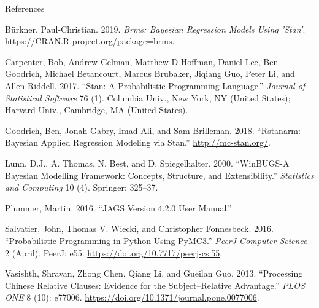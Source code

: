 \documentclass[12pt,ignorenonframetext,aspectratio=169]{beamer}
\begin{document}
\begin{frame}{References}
\protect\hypertarget{references}{}

\hypertarget{refs}{}
\leavevmode\hypertarget{ref-R-brms}{}%
Bürkner, Paul-Christian. 2019. \emph{Brms: Bayesian Regression Models Using 'Stan'}. \url{https://CRAN.R-project.org/package=brms}.

\leavevmode\hypertarget{ref-carpenter2017stan}{}%
Carpenter, Bob, Andrew Gelman, Matthew D Hoffman, Daniel Lee, Ben Goodrich, Michael Betancourt, Marcus Brubaker, Jiqiang Guo, Peter Li, and Allen Riddell. 2017. ``Stan: A Probabilistic Programming Language.'' \emph{Journal of Statistical Software} 76 (1). Columbia Univ., New York, NY (United States); Harvard Univ., Cambridge, MA (United States).

\leavevmode\hypertarget{ref-rstanarm}{}%
Goodrich, Ben, Jonah Gabry, Imad Ali, and Sam Brilleman. 2018. ``Rstanarm: Bayesian Applied Regression Modeling via Stan.'' \url{http://mc-stan.org/}.

\leavevmode\hypertarget{ref-lunn2000winbugs}{}%
Lunn, D.J., A. Thomas, N. Best, and D. Spiegelhalter. 2000. ``WinBUGS-A Bayesian Modelling Framework: Concepts, Structure, and Extensibility.'' \emph{Statistics and Computing} 10 (4). Springer: 325--37.

\leavevmode\hypertarget{ref-plummer2016jags}{}%
Plummer, Martin. 2016. ``JAGS Version 4.2.0 User Manual.''

\leavevmode\hypertarget{ref-Salvatier2016}{}%
Salvatier, John, Thomas V. Wiecki, and Christopher Fonnesbeck. 2016. ``Probabilistic Programming in Python Using PyMC3.'' \emph{PeerJ Computer Science} 2 (April). PeerJ: e55. \url{https://doi.org/10.7717/peerj-cs.55}.

\leavevmode\hypertarget{ref-vasishthProcessingChineseRelative2013}{}%
Vasishth, Shravan, Zhong Chen, Qiang Li, and Gueilan Guo. 2013. ``Processing Chinese Relative Clauses: Evidence for the Subject--Relative Advantage.'' \emph{PLOS ONE} 8 (10): e77006. \url{https://doi.org/10.1371/journal.pone.0077006}.

\end{frame}
\end{document}
